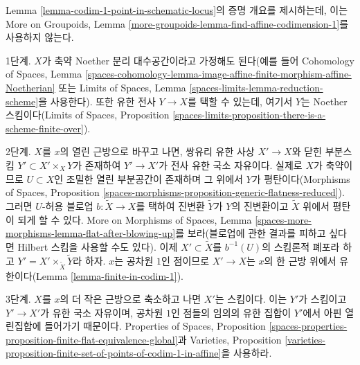\begin{remark}
\label{remark-alternate-proof-scheme-codim-1}
Lemma \ref{lemma-codim-1-point-in-schematic-locus}의 증명 개요를
제시하는데, 이는 More on Groupoids, Lemma
\ref{more-groupoids-lemma-find-affine-codimension-1}를 사용하지 않는다.

\medskip\noindent
1단계. $X$가 축약 Noether 분리 대수공간이라고 가정해도 된다(예를 들어
Cohomology of Spaces, Lemma
\ref{spaces-cohomology-lemma-image-affine-finite-morphism-affine-Noetherian}
또는 Limits of Spaces, Lemma
\ref{spaces-limits-lemma-reduction-scheme}을 사용한다). 또한 유한 전사
$Y \to X$를 택할 수 있는데, 여기서 $Y$는 Noether 스킴이다(Limits of
Spaces, Proposition
\ref{spaces-limits-proposition-there-is-a-scheme-finite-over}).

\medskip\noindent
2단계. $X$를 $x$의 열린 근방으로 바꾸고 나면, 쌍유리 유한 사상
$X' \to X$와 닫힌 부분스킴 $Y' \subset X' \times_X Y$가 존재하여
$Y' \to X'$가 전사 유한 국소 자유이다. 실제로 $X$가 축약이므로
$U \subset X$인 조밀한 열린 부분공간이 존재하며 그 위에서 $Y$가
평탄이다(Morphisms
of Spaces, Proposition
\ref{spaces-morphisms-proposition-generic-flatness-reduced}). 그러면
$U$-허용 블로업 $b : \tilde X \to X$를 택하여 진변환 $\tilde Y$가
$Y$의 진변환이고 $\tilde X$ 위에서 평탄이 되게 할 수 있다. More on
Morphisms of Spaces, Lemma
\ref{spaces-more-morphisms-lemma-flat-after-blowing-up}를 보라(블로업에 관한
결과를 피하고 싶다면 Hilbert 스킴을 사용할 수도 있다). 이제
$X' \subset \tilde X$를 $b^{-1}(U)$의 스킴론적 폐포라 하고
$Y' = X' \times_{\tilde X} \tilde Y$라 하자. $x$는 공차원 $1$인
점이므로 $X' \to X$는 $x$의 한 근방 위에서 유한이다(Lemma
\ref{lemma-finite-in-codim-1}).

\medskip\noindent
3단계. $X$를 $x$의 더 작은 근방으로 축소하고 나면 $X'$는 스킴이다.
이는 $Y'$가 스킴이고 $Y' \to X'$가 유한 국소 자유이며, 공차원
$1$인 점들의 임의의 유한 집합이 $Y'$에서 아핀 열린집합에 들어가기
때문이다.
Properties of Spaces, Proposition
\ref{spaces-properties-proposition-finite-flat-equivalence-global}과 Varieties,
Proposition
\ref{varieties-proposition-finite-set-of-points-of-codim-1-in-affine}을 사용하라.


\end{remark}
